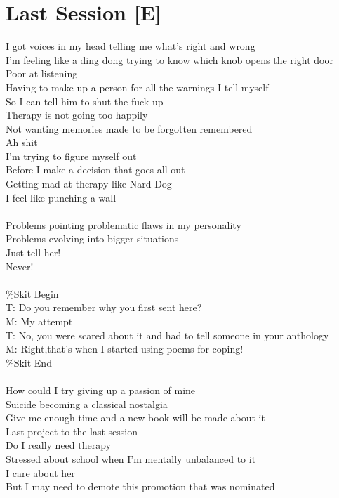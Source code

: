 \documentclass[12pt, b5paper, oneside]{book}
\begin{document}
\section{Last Session [E]}
I got voices in my head telling me what's right and wrong
\\I'm feeling like a ding dong trying to know which knob opens the right door
\\Poor at listening
\\Having to make up a person for all the warnings I tell myself
\\So I can tell him to shut the fuck up
\\Therapy is not going too happily
\\Not wanting memories made to be forgotten remembered
\\Ah shit
\\I'm trying to figure myself out
\\Before I make a decision that goes all out
\\Getting mad at therapy like Nard Dog
\\I feel like punching a wall
%
\\\\Problems pointing problematic flaws in my personality
\\Problems evolving into bigger situations
\\Just tell her!
\\Never!
%
\\\\\%Skit Begin
\\T: Do you remember why you first sent here?
\\M: My attempt
\\T: No, you were scared about it and had to tell someone in your anthology
\\M: Right,that's when I started using poems for coping!
\\\%Skit End
%
\\\\How could I try giving up a passion of mine
\\Suicide becoming a classical nostalgia
\\Give me enough time and a new book will be made about it
\\Last project to the last session
\\Do I really need therapy
\\Stressed about school when I'm mentally unbalanced to it
\\I care about her
\\But I may need to demote this promotion that was nominated
\end{document}
